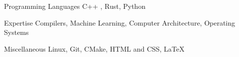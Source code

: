 
\begin{cvskills}

  \cvskill
    {Programming Languages}
    {C++ , Rust, Python}

  \cvskill
    {Expertise}
    {Compilers, Machine Learning, Computer Architecture, Operating Systems}

  \cvskill
    {Miscellaneous}
    {Linux, Git, CMake, HTML and CSS, \LaTeX}

\end{cvskills}
